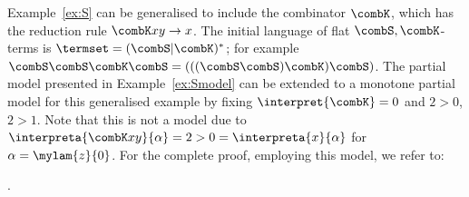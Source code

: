 \begin{example}
\label{ex:SK}
Example~\ref{ex:S} can be generalised 
to include the combinator $\combK$,
which has the reduction rule $\combK x y \to x$.
The initial language of flat $\combS,\combK$-terms is $\termset = (\combS|\combK)^*$; 
for example $\combS \combS \combK \combS = (((\combS \combS) \combK) \combS)$.
The partial model presented in Example~\ref{ex:Smodel}
can be extended to a monotone partial model for this generalised example 
by fixing $\interpret{\combK} = 0$
and $2 > 0$, $2 > 1$.
Note that this is not a model due to
$\interpreta{\combK x y}{\alpha} = 2 > 0 = \interpreta{x}{\alpha}$ 
for $\alpha = \mylam{z}{0}$.
For the complete proof, employing this model, we refer to: \begin{center}
.
\end{center}
\end{example}



